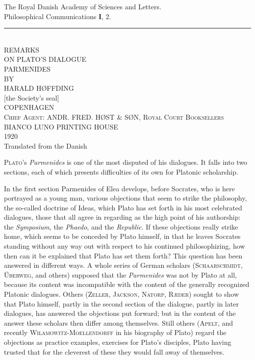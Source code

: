 \documentclass[12pt,a4paper,openany]{book}
\newcommand{\opage}[1]{\marginnote{\footnotesize\textit{[#1]}}}
\begin{document}
\begin{titlepage}
\begin{center}
The Royal Danish Academy of Sciences and Letters.\\[0.2em]
{\small Philosophical Communications \textbf{I}, 2.}\\[0.3em]
\rule{\textwidth}{0.4pt}\\[5em]
{\LARGE REMARKS}\\[0.4em]
{\LARGE ON PLATO'S DIALOGUE}\\[0.4em]
{\LARGE PARMENIDES}\\[2em]
{\small BY}\\[2em]
{\large HARALD HØFFDING}\\[4em]
[the Society's seal]\\[5em]
{\Large COPENHAGEN}\\[0.6em]
{\small\textsc{Chief Agent:}} ANDR. FRED. HØST \& SØN, {\small\textsc{Royal Court Booksellers}}\\[1.2em]
BIANCO LUNO PRINTING HOUSE\\[0.3em]
1920\\[3em]
{\small Translated from the Danish}
\end{center}
\end{titlepage}
\clearpage

\setcounter{footnote}{0}%
\opage{3}P\textsc{lato}’s \textit{Parmenides} is one of the most disputed of
his dialogues. It falls into two sections, each of which
presents difficulties of its own for Platonic scholarship.

In the first section Parmenides of Elea develops, before
Socrates, who is here portrayed as a young man, various
objections that seem to strike the philosophy,
the so-called doctrine of Ideas, which Plato has set forth in his most celebrated
dialogues, those that all agree in regarding as
the high point of his authorship: the \textit{Symposium},
the \textit{Phaedo}, and the \textit{Republic}. If these objections really
strike home, which seems to be conceded by Plato
himself, in that he leaves Socrates standing without any way out with respect
to his continued philosophizing, how then can it be explained
that Plato has set them forth? This question has
been answered in different ways. A whole series of German
scholars (\textsc{Schaarschmidt}, \textsc{Überweg}, and others) supposed that the \textit{Parmenides}
was not by Plato at all, because its content was incompatible
with the content of the generally recognized Platonic
dialogues. Others (\textsc{Zeller}, \textsc{Jackson}, \textsc{Natorp}, \textsc{Ræder})
sought to show that Plato himself, partly in the second section of the dialogue,
partly in later dialogues, has answered the objections put forward;
but in the content of the answer these scholars then differ
among themselves. Still others (\textsc{Apelt}, and recently \textsc{Wilamowitz-Moellendorff}
 in his biography of Plato) regard the objections
\setcounter{footnote}{0}%
\opage{4}as practice examples, exercises for Plato’s disciples, Plato
having trusted that for the cleverest of these they would
fall away of themselves.
\end{document}
